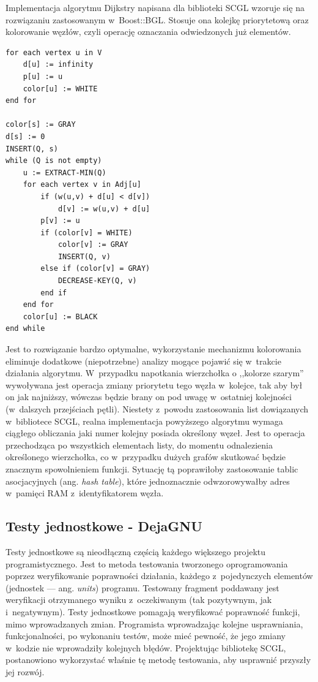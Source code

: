 \documentclass[a4paper,12pt,polish,twoside,openright]{thesis}
\begin{document}
Implementacja algorytmu Dijkstry napisana dla biblioteki SCGL wzoruje się na rozwiązaniu zastosowanym w~Boost::BGL\cite{bgl}.
Stosuje ona kolejkę priorytetową oraz kolorowanie węzłów, czyli operację oznaczania odwiedzonych już elementów.
\begin{lstlisting}[style=code,caption=Pseudokod implementowanego w SCGL algorytmu Dijkstry]
for each vertex u in V
	d[u] := infinity
	p[u] := u
	color[u] := WHITE
end for

color[s] := GRAY
d[s] := 0
INSERT(Q, s)
while (Q is not empty)
	u := EXTRACT-MIN(Q)
	for each vertex v in Adj[u]
		if (w(u,v) + d[u] < d[v])
			d[v] := w(u,v) + d[u]
		p[v] := u
		if (color[v] = WHITE)
			color[v] := GRAY
			INSERT(Q, v)
		else if (color[v] = GRAY)
			DECREASE-KEY(Q, v)
		end if
	end for
	color[u] := BLACK
end while
\end{lstlisting}
Jest to rozwiązanie bardzo optymalne, wykorzystanie mechanizmu kolorowania eliminuje dodatkowe (niepotrzebne) analizy mogące pojawić się w~trakcie działania algorytmu.
W~przypadku napotkania wierzchołka o ,,kolorze szarym'' wywoływana jest operacja zmiany priorytetu tego węzła w~kolejce, tak aby był on jak najniższy, wówczas będzie brany on pod uwagę w~ostatniej kolejności (w~dalszych przejściach pętli).
Niestety z~powodu zastosowania list dowiązanych w~bibliotece SCGL, realna implementacja powyższego algorytmu wymaga ciągłego obliczania jaki numer kolejny posiada określony węzeł.
Jest to operacja przechodząca po wszystkich elementach listy, do momentu odnalezienia określonego wierzchołka, co w~przypadku dużych grafów skutkować będzie znacznym spowolnieniem funkcji.
Sytuację tą poprawiłoby zastosowanie tablic asocjacyjnych (ang. \emph{hash table}), które jednoznacznie odwzorowywałby adres w~pamięci RAM z~identyfikatorem węzła.

\subsection{Testy jednostkowe - DejaGNU}
Testy jednostkowe są nieodłączną częścią każdego większego projektu programistycznego.
Jest to metoda testowania tworzonego oprogramowania poprzez weryfikowanie poprawności działania, każdego z~pojedynczych elementów (jednostek --- ang. \emph{units}) programu.
Testowany fragment poddawany jest weryfikacji otrzymanego wyniku z~oczekiwanym (tak pozytywnym, jak i~negatywnym).
Testy jednostkowe pomagają weryfikować poprawność funkcji, mimo wprowadzanych zmian.
Programista wprowadzając kolejne usprawniania, funkcjonalności, po wykonaniu testów, może mieć pewność, że jego zmiany w~kodzie nie wprowadziły kolejnych błędów.
Projektując bibliotekę SCGL, postanowiono wykorzystać właśnie tę metodę testowania, aby usprawnić przyszły jej rozwój.
\end{document}
